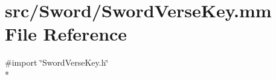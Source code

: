 \hypertarget{_sword_verse_key_8mm}{\section{src/\-Sword/\-Sword\-Verse\-Key.mm File Reference}
\label{_sword_verse_key_8mm}
}
{\ttfamily \#import \char`\"{}Sword\-Verse\-Key.\-h\char`\"{}}\\*
